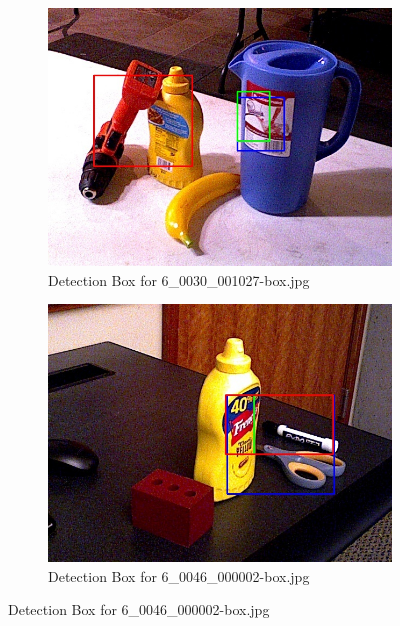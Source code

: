 \documentclass[10.5pt,a4paper]{article}
\begin{document}
\begin{figure}
    \vspace{2em}

    \begin{subfigure}{0.45\textwidth}
        \centering
        \includegraphics[width=\textwidth]{img/6_0030_001027-box.jpg}
        \caption{Detection Box for 6\_0030\_001027-box.jpg}
        \label{fig:img17}
    \end{subfigure}
    \hfill
    \begin{subfigure}{0.45\textwidth}
        \centering
        \includegraphics[width=\textwidth]{img/6_0046_000002-box.jpg}
        \caption{Detection Box for 6\_0046\_000002-box.jpg}
        \label{fig:img18}
    \end{subfigure}
    \end{figure}
\end{document}
